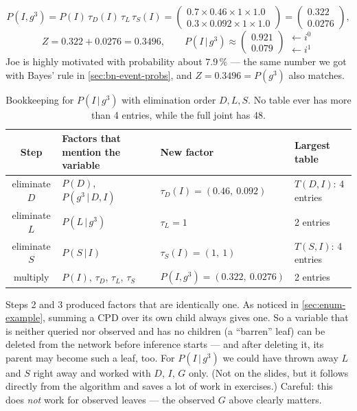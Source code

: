 \documentclass[11pt, oneside]{book}
\newcommand{\Prob}{\mathbb{P}}           %
\newcommand{\given}{\,\vert\,}           %
\begin{document}
\begin{exbox}[title={Finally: multiply and normalise}]
\[
P(I, g^3) = P(I)\, \tau_D(I)\, \tau_L\, \tau_S(I)
= \begin{pmatrix} 0.7 \times 0.46 \times 1 \times 1.0 \\ 0.3 \times 0.092 \times 1 \times 1.0 \end{pmatrix}
= \begin{pmatrix} 0.322 \\ 0.0276 \end{pmatrix},
\]
\[
Z = 0.322 + 0.0276 = 0.3496, \qquad
P(I \given g^3) \approx \begin{pmatrix} 0.921 \\ 0.079 \end{pmatrix}
\begin{matrix} \leftarrow i^0 \\ \leftarrow i^1 \end{matrix}
\]
Joe is highly motivated with probability about $7.9\,\%$ --- the same number we
got with Bayes' rule in \cref{sec:bn-event-probs}, and $Z = 0.3496 = P(g^3)$
also matches.
\end{exbox}

\begin{table}[htbp]
\centering
\small
\begin{tabular}{@{}clll@{}}
\toprule
\textbf{Step} & \textbf{Factors that mention the variable} & \textbf{New factor} & \textbf{Largest table} \\
\midrule
eliminate $D$ & $P(D)$, $P(g^3 \given D, I)$ & $\tau_D(I) = (0.46,\ 0.092)$ & $T(D, I)$: 4 entries \\
eliminate $L$ & $P(L \given g^3)$             & $\tau_L = 1$                 & 2 entries \\
eliminate $S$ & $P(S \given I)$               & $\tau_S(I) = (1,\ 1)$        & $T(S, I)$: 4 entries \\
multiply      & $P(I)$, $\tau_D$, $\tau_L$, $\tau_S$ & $P(I, g^3) = (0.322,\ 0.0276)$ & 2 entries \\
\bottomrule
\end{tabular}
\caption{Bookkeeping for $P(I \given g^3)$ with elimination order $D, L, S$.
No table ever has more than 4 entries, while the full joint has 48.}
\label{tab:ve-bookkeeping}
\end{table}

\begin{notebox}[title={Shortcut: unobserved leaves contribute nothing}]
Steps 2 and 3 produced factors that are identically one. As noticed in
\cref{sec:enum-example}, summing a CPD over its own child always gives one. So
a variable that is neither queried nor observed and has no children (a
``barren'' leaf) can be deleted from the network before inference starts ---
and after deleting it, its parent may become such a leaf, too. For $P(I
\given g^3)$ we could have thrown away $L$ and $S$ right away and worked with
$D$, $I$, $G$ only. (Not on the slides, but it follows directly from the
algorithm and saves a lot of work in exercises.) Careful: this does
\emph{not} work for observed leaves --- the observed $G$ above clearly
matters.
\end{notebox}
\end{document}
